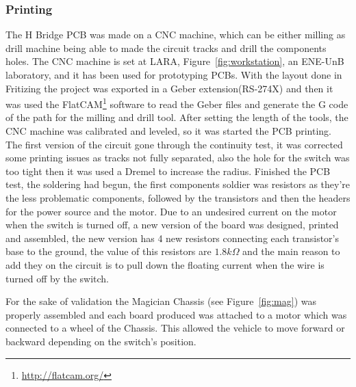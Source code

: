     \subsubsection{Printing} %
    \label{ssub:printing}
        The H Bridge PCB was made on a CNC machine, which can be either milling as drill machine being able to made the circuit tracks and drill the components holes. The CNC machine is set at LARA, Figure~\ref{fig:workstation}, an ENE-UnB laboratory, and it has been used for prototyping PCBs. With the layout done in Fritizing the project was exported in a Geber extension(RS-274X) and then it was used the FlatCAM\footnote{\url{http://flatcam.org/}} software to read the Geber files and generate the G code of the path for the milling and drill tool. After setting the length of the tools, the CNC machine was calibrated and leveled, so it was started the PCB printing. The first version of the circuit gone through the continuity test, it was corrected some printing issues as tracks not fully separated, also the hole for the switch was too tight then it was used a Dremel to increase the radius. Finished the PCB test, the soldering had begun, the first components soldier was resistors as they're the less problematic components, followed by the transistors and then the headers for the power source and the motor. Due to an undesired current on the motor when the switch is turned off, a new version of the board was designed, printed and assembled, the new version has 4 new resistors connecting each transistor's base to the ground, the value of this resistors are $1.8k\Omega$ and the main reason to add they on the circuit is to pull down the floating current when the wire is turned off by the switch.
	
	For the sake of validation the Magician Chassis (see Figure~\ref{fig:mag}) was properly assembled and each board produced was attached to a motor which was connected to a wheel of the Chassis. This allowed the vehicle to move forward or backward depending on the switch's position.

